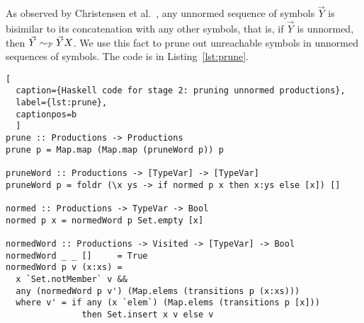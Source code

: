
As observed by Christensen et
al.~\cite{DBLP:journals/iandc/ChristensenHS95}, any unnormed sequence
of symbols $\vec Y$ is bisimilar to its concatenation with any other
symbols, that is, if $\vec Y$ is unnormed, then
$\vec Y \sim_\mathcal P \vec YX$.
%
%
We use this fact
to prune out unreachable symbols in unnormed sequences of symbols. The
code is in Listing~\ref{lst:prune}. 

\begin{lstlisting}[
  caption={Haskell code for stage 2: pruning unnormed productions},
  label={lst:prune},
  captionpos=b
  ]
prune :: Productions -> Productions
prune p = Map.map (Map.map (pruneWord p)) p

pruneWord :: Productions -> [TypeVar] -> [TypeVar]
pruneWord p = foldr (\x ys -> if normed p x then x:ys else [x]) []

normed :: Productions -> TypeVar -> Bool
normed p x = normedWord p Set.empty [x]

normedWord :: Productions -> Visited -> [TypeVar] -> Bool
normedWord _ _ []     = True
normedWord p v (x:xs) =
  x `Set.notMember` v &&
  any (normedWord p v') (Map.elems (transitions p (x:xs)))
  where v' = if any (x `elem`) (Map.elems (transitions p [x]))
               then Set.insert x v else v
\end{lstlisting}

